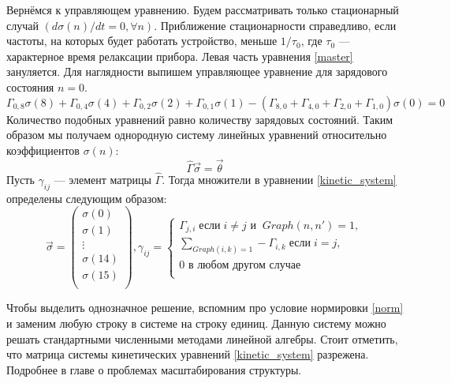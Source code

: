 \documentclass[12pt,a4paper]{report}
\begin{document}
Вернёмся к управляющем уравнению. Будем рассматривать только стационарный случай $(d\sigma(n)/{dt} = 0 , \forall n)$.  Приближение стационарности справедливо, если частоты, на которых будет работать устройство, меньше $1/\tau_0$, где $\tau_0$ — характерное время релаксации прибора. Левая часть уравнения \ref{master} зануляется. Для наглядности выпишем управляющее уравнение для зарядового состояния $n = 0$.
\begin{equation}
\Gamma_{0, 8} \sigma(8) + \Gamma_{0, 4} \sigma(4) + \Gamma_{0, 2} \sigma(2) +\Gamma_{0, 1} \sigma(1) - (\Gamma_{8, 0} + \Gamma_{4, 0} + \Gamma_{2, 0} + \Gamma_{1, 0})\sigma(0) = 0
\end{equation}
Количество подобных уравнений равно количеству зарядовых состояний. Таким образом мы получаем однородную систему линейных уравнений относительно коэффициентов $\sigma(n)$: 
\begin{equation}\label{kinetic_system}
\hat \Gamma \vec{\sigma} = \vec{\theta}
\end{equation}
Пусть $\gamma_{ij}$ — элемент матрицы $\hat \Gamma$. Тогда множители в уравнении \ref{kinetic_system} определены следующим образом:
\begin{equation}
\vec{\sigma} = \left(
\begin{array}{c}
  \sigma(0)\\
  \sigma(1)\\
 \vdots\\
  \sigma(14)\\
  \sigma(15)\\
  \end{array}
  \right),   \gamma_{ij}=
  \left\{
  \begin{array}{c}
    \Gamma_{j,i}\;\mbox{если}\;i \neq j \mbox{ и }\ Graph(n, n') = 1,\\
    \sum\limits_{Graph(i, k) = 1} -\Gamma_{i,k} \;\mbox{если}\;i = j, \\
    0 \mbox{ в любом другом случае }\\\
  \end{array}
  \right.
\end{equation}

Чтобы выделить однозначное решение, вспомним про условие нормировки \ref{norm} и заменим любую строку в системе на строку единиц. Данную систему можно решать стандартными численными методами  линейной алгебры. Стоит отметить, что матрица системы кинетических уравнений \ref{kinetic_system} разрежена. Подробнее в главе о проблемах масштабирования структуры.
\end{document}
